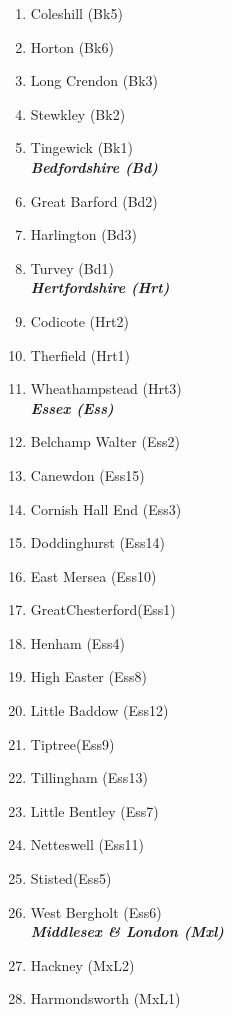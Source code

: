 \begin{refsection}
\begin{multicols}{2}
\begin{enumerate}
		\item Coleshill (Bk5)
		\item Horton (Bk6)
		\item Long Crendon (Bk3)
		\item Stewkley (Bk2)
		\item Tingewick (Bk1)\\
		\emph{\textbf{Bedfordshire (Bd)}}
		\item Great Barford (Bd2)
		\item Harlington (Bd3)
		\item Turvey (Bd1)\\
		\emph{\textbf{Hertfordshire (Hrt)}}
		\item Codicote (Hrt2)
		\item Therfield (Hrt1)
		\item Wheathampstead (Hrt3)\\
		\emph{\textbf{Essex (Ess)}}
		\item Belchamp Walter (Ess2)
		\item Canewdon (Ess15)
		\item Cornish Hall End (Ess3)
		\item Doddinghurst (Ess14)
		\item East Mersea (Ess10)
		\item GreatChesterford(Ess1)
		\item Henham (Ess4)
		\item High Easter (Ess8)
		\item Little Baddow (Ess12)
		\item Tiptree(Ess9)
		\item Tillingham (Ess13)
		\item Little Bentley (Ess7)
		\item Netteswell (Ess11)
		\item Stisted(Ess5)
		\item West Bergholt (Ess6)\\
		\emph{\textbf{Middlesex \& London (Mxl)}}
		\item Hackney (MxL2)
		\item Harmondsworth (MxL1)
	\end{enumerate}
	\end{multicols}
\end{refsection}

